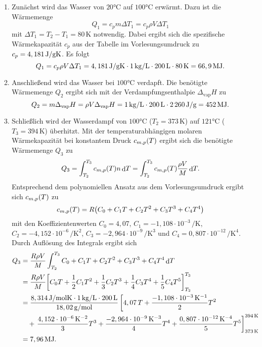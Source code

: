 \documentclass[german,12pt]{homework}
\newcommand{\dd}{\,\differ}
\DeclareMathOperator{\differ}{d}
\DeclarePairedDelimiter{\enbrace}{(}{)}
\DeclarePairedDelimiter{\benbrace}{[}{]}
\begin{document}
    \begin{enumerate}
        \item Zunächst wird das Wasser von \(20\si{\degreeCelsius}\) auf \(100\si{\degreeCelsius}\) erwärmt. Dazu ist die Wärmemenge
        \[Q_1 = c_pm{\Delta}T_1 = c_p\rho{V}{\Delta}T_1\]
        mit \({\Delta}T_1 = T_2 - T_1 = 80\,\si{\kelvin}\) notwendig. Dabei ergibt sich die spezifische Wärmekapazität \(c_p\) aus der Tabelle im Vorlesungsumdruck zu \(c_p = 4,181\,\si{\joule\per{\g\kelvin}}\). Es folgt
        \[Q_1 = c_p\rho{V}{\Delta}T_1 = 4,181\,\si{\joule\per{\g\kelvin}} \cdot 1\,\si{\kg\per{\liter}} \cdot 200\,\si{\liter} \cdot 80\,\si{\kelvin} = 66,9\,\si{\mega\joule}.\]
        \item Anschließend wird das Wasser bei \(100\si{\degreeCelsius}\) verdapft. Die benötigte Wärmemenge \(Q_2\) ergibt sich mit der Verdampfungsenthalpie \(\Delta_\text{vap}H\) zu
        \[Q_2 = m\Delta_\text{vap}H = \rho{V}\Delta_\text{vap}H = 1\,\si{\kg\per{\liter}} \cdot 200\,\si{\liter} \cdot 2\,260\,\si{\joule\per{\g}} = 452\,\si{\mega\joule}.\]
        \item Schließlich wird der Wasserdampf von \(100\si{\degreeCelsius}\) (\(T_2 = 373\,\si{\kelvin}\)) auf \(121\si{\degreeCelsius}\) (\(T_3 = 394\,\si{\kelvin}\)) überhitzt. Mit der temperaturabhängigen molaren Wärmekapazität bei konstantem Druck \(c_{m, p}\enbrace*{T}\) ergibt sich die benötigte Wärmemenge \(Q_3\) zu
        \[Q_3 = \int_{T_2}^{T_3}c_{m, p}\enbrace*{T}n{\dd}T = \int_{T_2}^{T_3}c_{m, p}\enbrace*{T}\frac{\rho{V}}{M}{\dd}T.\]
        Entsprechend dem polynomiellen Ansatz aus dem Vorlesungsumdruck ergibt sich \(c_{m, p}\enbrace*{T}\) zu
        \[c_{m, p}\enbrace*{T} = R\enbrace*{C_0 + C_1T + C_2T^2 + C_3T^3 + C_4T^4}\]
        mit den Koeffizientenwerten \(C_0 = 4,07\), \(C_1 = -1,108 \cdot 10^{-3}\,\si{\per\kelvin}\), \(C_2 = -4,152 \cdot 10^{-6}\,\si{\per\kelvin\squared}\), \(C_3 = -2,964 \cdot 10^{-9}\,\si{\per\kelvin\cubed}\) und \(C_4 = 0,807 \cdot 10^{-12}\,\si{\per\kelvin\tothe{4}}\). Durch Auflösung des Integrals ergibt sich
        \begin{align*}
            Q_3 &= \frac{R\rho{V}}{M}\int_{T_2}^{T_3}C_0 + C_1T + C_2T^2 + C_3T^3 + C_4T^4{\dd}T\\
            &= \frac{R\rho{V}}{M}\benbrace*{C_0T + \frac{1}{2}C_1T^2 + \frac{1}{3}C_2T^3 + \frac{1}{4}C_3T^4 + \frac{1}{5}C_4T^5}_{T_2}^{T_3}\\
            &= \frac{8,314\,\si{\joule\per{\mole\kelvin}} \cdot 1\,\si{\kg\per{\liter}} \cdot 200\,\si{\liter}}{18,02\,\si{\g\per{\mole}}}\left[4,07\,T + \frac{-1,108 \cdot 10^{-3}\,\si{\per\kelvin}}{2}T^2\right.\\
            &\ \ \ + \left.\frac{4,152 \cdot 10^{-6}\,\si{\per\kelvin\squared}}{3}T^3 + \frac{-2,964 \cdot 10^{-9}\,\si{\per\kelvin\cubed}}{4}T^4 + \frac{0,807 \cdot 10^{-12}\,\si{\per\kelvin\tothe{4}}}{5}T^5\right]_{373\,\si{\kelvin}}^{394\,\si{\kelvin}}\\
            & = 7,96\,\si{\mega\joule}.
        \end{align*}
    \end{enumerate}
\end{document}
